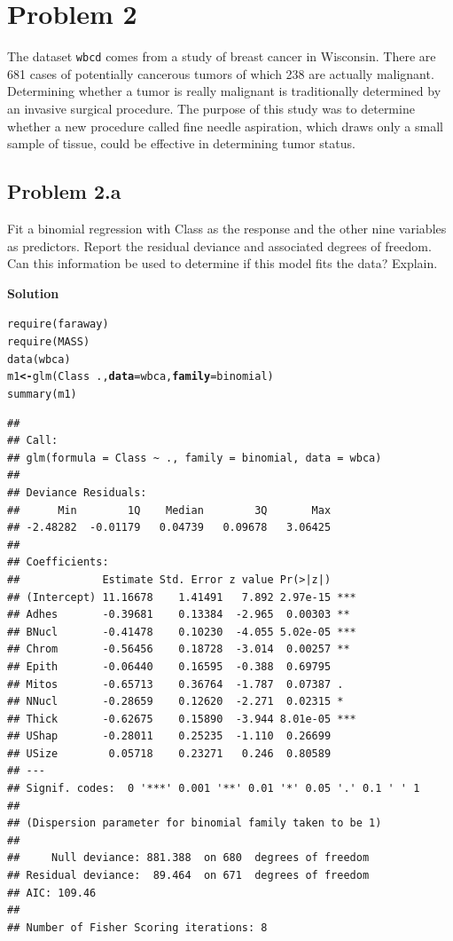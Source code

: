 \documentclass[12pt,oneside,a4paper]{article}\usepackage[]{graphicx}\usepackage[]{xcolor}
\title{\hmwkTitle}
\author{\hmwkAuthorName}
\date{\today}
\makeatletter
\newcommand{\hlopt}[1]{\textcolor[rgb]{0,0,0}{#1}}%
\newcommand{\hlstd}[1]{\textcolor[rgb]{0,0,0}{#1}}%
\newcommand{\hlkwb}[1]{\textcolor[rgb]{0.498,0,0.333}{\textbf{#1}}}%
\newcommand{\hlkwc}[1]{\textcolor[rgb]{0.498,0,0.333}{\textbf{#1}}}%
\newcommand{\hlkwd}[1]{\textcolor[rgb]{0,0,0}{#1}}%
\newenvironment{kframe}{%
 \def\at@end@of@kframe{}%
 \ifinner\ifhmode%
  \def\at@end@of@kframe{\end{minipage}}%
  \begin{minipage}{\columnwidth}%
 \fi\fi%
 \def\FrameCommand##1{\hskip\@totalleftmargin \hskip-\fboxsep
 \colorbox{shadecolor}{##1}\hskip-\fboxsep
     \hskip-\linewidth \hskip-\@totalleftmargin \hskip\columnwidth}%
 \MakeFramed {\advance\hsize-\width
   \@totalleftmargin\z@ \linewidth\hsize
   \@setminipage}}%
 {\par\unskip\endMakeFramed%
 \at@end@of@kframe}
\newenvironment{knitrout}{}{} %
\newcommand{\problem}[1]
{
    \clearpage
    \section*{Problem {#1}}
}
\newcommand{\subproblem}[1]
{
    \subsection*{Problem {#1}}
}
\newcommand{\solution}
{
    \vspace{15pt}
    \noindent\ignorespaces\textbf{\large Solution}\par
}
\newcommand{\m}[1]{\texttt{{#1}}}
\makeatother
\begin{document}
\maketitle



\problem{2}
The dataset \m{wbcd} comes from a study of breast cancer in Wisconsin. There are 681 cases of potentially cancerous tumors of which 238 are actually malignant. Determining whether a tumor is really malignant is traditionally determined by an invasive surgical procedure. The purpose of this study was to determine whether a new procedure called fine needle aspiration, which draws only a small sample of tissue, could be effective in determining tumor status.

\subproblem{2.a}
Fit a binomial regression with Class as the response and the other nine variables as predictors. Report the residual deviance and associated degrees of freedom. Can this information be used to determine if this model fits the data? Explain.

\solution
\begin{knitrout}
\color{fgcolor}\begin{kframe}
\begin{alltt}
\hlkwd{require}\hlstd{(faraway)}
\hlkwd{require}\hlstd{(MASS)}
\hlkwd{data}\hlstd{(wbca)}
\hlstd{m1} \hlkwb{<-} \hlkwd{glm}\hlstd{(Class} \hlopt{~} \hlstd{.,} \hlkwc{data} \hlstd{= wbca,} \hlkwc{family} \hlstd{= binomial)}
\hlkwd{summary}\hlstd{(m1)}
\end{alltt}
\begin{verbatim}
## 
## Call:
## glm(formula = Class ~ ., family = binomial, data = wbca)
## 
## Deviance Residuals: 
##      Min        1Q    Median        3Q       Max  
## -2.48282  -0.01179   0.04739   0.09678   3.06425  
## 
## Coefficients:
##             Estimate Std. Error z value Pr(>|z|)    
## (Intercept) 11.16678    1.41491   7.892 2.97e-15 ***
## Adhes       -0.39681    0.13384  -2.965  0.00303 ** 
## BNucl       -0.41478    0.10230  -4.055 5.02e-05 ***
## Chrom       -0.56456    0.18728  -3.014  0.00257 ** 
## Epith       -0.06440    0.16595  -0.388  0.69795    
## Mitos       -0.65713    0.36764  -1.787  0.07387 .  
## NNucl       -0.28659    0.12620  -2.271  0.02315 *  
## Thick       -0.62675    0.15890  -3.944 8.01e-05 ***
## UShap       -0.28011    0.25235  -1.110  0.26699    
## USize        0.05718    0.23271   0.246  0.80589    
## ---
## Signif. codes:  0 '***' 0.001 '**' 0.01 '*' 0.05 '.' 0.1 ' ' 1
## 
## (Dispersion parameter for binomial family taken to be 1)
## 
##     Null deviance: 881.388  on 680  degrees of freedom
## Residual deviance:  89.464  on 671  degrees of freedom
## AIC: 109.46
## 
## Number of Fisher Scoring iterations: 8
\end{verbatim}
\end{kframe}
\end{knitrout}
\end{document}
